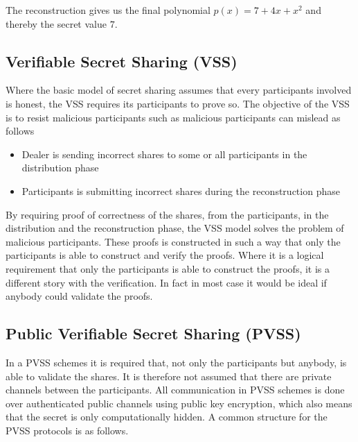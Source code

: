 \noindent
The reconstruction gives us the final polynomial $p(x)=7 + 4x+ x^2$ and thereby the secret value $7$.


\subsection{Verifiable Secret Sharing (VSS)}
Where the basic model of secret sharing assumes that every participants involved is honest, the VSS requires its participants to prove so. The objective of the VSS is to resist malicious participants such as malicious participants can mislead as follows \cite{Schoenmakers1999}

\begin{itemize}
    \item Dealer is sending incorrect shares to some or all participants in the distribution phase
    \item Participants is submitting incorrect shares during the reconstruction phase
\end{itemize}

\noindent 
By requiring proof of correctness of the shares, from the participants, in the distribution and the reconstruction phase, the VSS model solves the problem of malicious participants. These proofs is constructed in such a way that only the participants is able to construct and verify the proofs. Where it is a logical requirement that only the participants is able to construct the proofs, it is a different story with the verification. In fact in most case it would be ideal if anybody could validate the proofs. 


\subsection{Public Verifiable Secret Sharing (PVSS)}
In a PVSS schemes it is required that, not only the participants but anybody, is able to validate the shares. It is therefore not assumed that there are private channels between the participants. All communication in PVSS schemes  is done over authenticated public channels using public key encryption, which also means that the secret is only computationally hidden. A common structure for the PVSS protocols is as follows.

